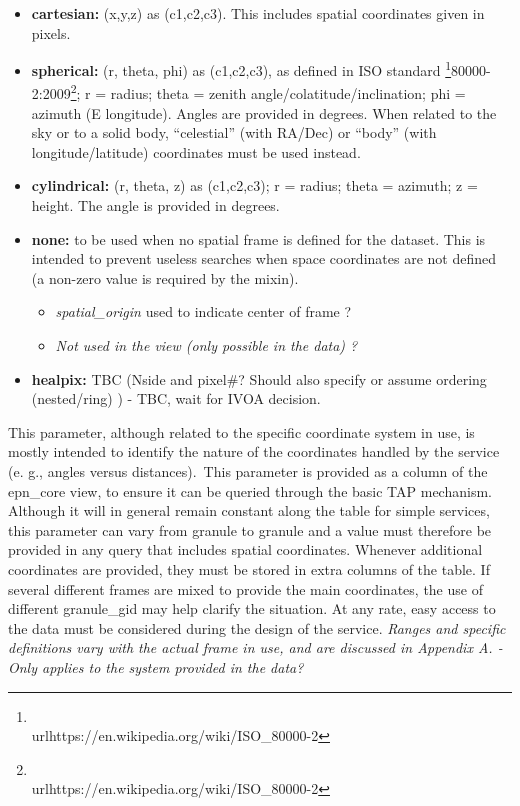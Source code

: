 \documentclass[11pt,a4paper]{ivoa}
\begin{document}
\begin{itemize}
\item \textbf{cartesian:} (x,y,z) as (c1,c2,c3). This includes spatial coordinates given in pixels.
\item \textbf{spherical:} (r, theta, phi) as (c1,c2,c3), as defined in ISO standard \footnote{\\url{https://en.wikipedia.org/wiki/ISO\_80000-2}}80000-2:2009\footnote{\\url{https://en.wikipedia.org/wiki/ISO\_80000-2}}; r = radius; theta = zenith angle/colatitude/inclination; phi = azimuth (E longitude). Angles are provided in degrees. When related to the sky or to a solid body, ``celestial'' (with RA/Dec) or ``body'' (with longitude/latitude) coordinates must be used instead.
\item \textbf{cylindrical:} (r, theta, z) as (c1,c2,c3); r = radius; theta = azimuth; z = height. The angle is provided in degrees.
\item \textbf{none:} to be used when no spatial frame is defined for the dataset. This is intended to prevent useless searches when space coordinates are not defined (a non-zero value is required by the mixin).\begin{itemize}
\item \emph{spatial\_origin} used to indicate center of frame ?
\item \emph{Not used in the view (only possible in the data) ?}
\end{itemize}


\item \textbf{healpix:} TBC (Nside and pixel\#? Should also specify or assume ordering (nested/ring) ) - TBC, wait for IVOA decision.
\end{itemize}

This parameter, although related to the specific coordinate system in use, is mostly intended to identify the nature of the coordinates handled by the service (e. g., angles versus distances). This parameter is provided as a column of the epn\_core view, to ensure it can be queried through the basic TAP mechanism. Although it will in general remain constant along the table for simple services, this parameter can vary from granule to granule and a value must therefore be provided in any query that includes spatial coordinates. Whenever additional coordinates are provided, they must be stored in extra columns of the table. If several different frames are mixed to provide the main coordinates, the use of different granule\_gid may help clarify the situation. At any rate, easy access to the data must be considered during the design of the service. \emph{Ranges and specific definitions vary with the actual frame in use, and are discussed in Appendix A. - Only applies to the system provided in the data?} 
\end{document}
